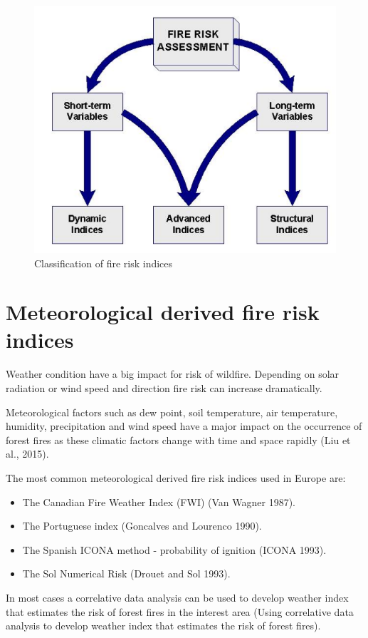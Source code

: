 {{{	\begin{figure}[H]
		\centering
		\includegraphics[width=0.8\linewidth]{images/fire_risk_indices.png}
		\caption{Classification of fire risk indices}
		\label{fig:copernicus_hub}
	\end{figure}

\section{Meteorological derived fire risk indices}
	Weather condition have a big impact for risk of wildfire. Depending on solar radiation  or wind speed and direction fire risk can increase dramatically. 
	
	Meteorological factors such as dew point, soil temperature, air temperature, humidity, precipitation and wind speed have
	a major impact on the occurrence of forest fires as these climatic factors change with time and space rapidly (Liu et al., 2015).
	
	The most common meteorological derived fire risk indices used in Europe are:
	
	\begin{itemize}
		\item The Canadian Fire Weather Index (FWI) (Van Wagner 1987).
		\item The Portuguese index (Goncalves and Lourenco 1990).
		\item The Spanish ICONA method - probability of ignition (ICONA 1993).
		\item The Sol Numerical Risk (Drouet and Sol 1993).
	\end{itemize}

	In most cases a correlative data analysis can be used to develop weather index that estimates the risk of forest fires in the interest area (Using correlative data analysis to develop weather index that estimates the risk of forest fires).

}}}
